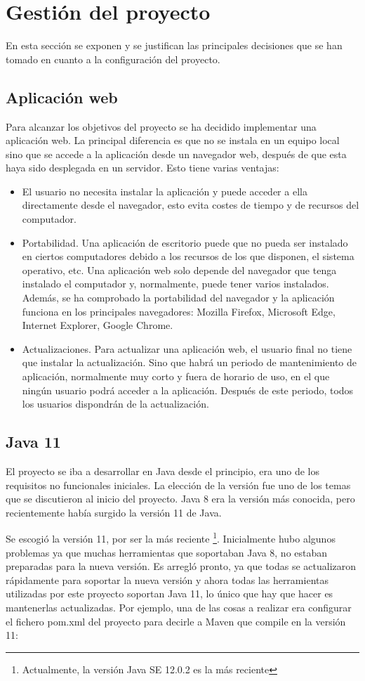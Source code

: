\section{Gestión del proyecto}
En esta sección se exponen y se justifican las principales decisiones que se han tomado en cuanto a la configuración del proyecto.
\subsection{Aplicación web}
Para alcanzar los objetivos del proyecto se ha decidido implementar una aplicación web. La principal diferencia es que no se instala en un equipo local sino que se accede a la aplicación desde un navegador web, después de que esta haya sido desplegada en un servidor. Esto tiene varias ventajas: 
\begin{itemize}
	\item El usuario no necesita instalar la aplicación y puede acceder a ella directamente desde el navegador, esto evita costes de tiempo y de recursos del computador.
	\item  Portabilidad. Una aplicación de escritorio puede que no pueda ser instalado en ciertos computadores debido a los recursos de los que disponen, el sistema operativo, etc. Una aplicación web solo depende del navegador que tenga instalado el computador y, normalmente, puede tener varios instalados. Además, se ha comprobado la portabilidad del navegador y la aplicación funciona en los principales navegadores: Mozilla Firefox, Microsoft Edge, Internet Explorer, Google Chrome.
	\item Actualizaciones. Para actualizar una aplicación web, el usuario final no tiene que instalar la actualización. Sino que habrá un periodo de mantenimiento de aplicación, normalmente muy corto y fuera de horario de uso, en el que ningún usuario podrá acceder a la aplicación. Después de este periodo, todos los usuarios dispondrán de la actualización.
\end{itemize}
\subsection{Java 11}
El proyecto se iba a desarrollar en Java desde el principio, era uno de los requisitos no funcionales iniciales. La elección de la versión fue uno de los temas que se discutieron al inicio del proyecto. Java 8 era la versión más conocida, pero recientemente había surgido la versión 11 de Java. 

Se escogió la versión 11, por ser la más reciente \footnote{Actualmente, la versión Java SE 12.0.2 es la más reciente}. Inicialmente hubo algunos problemas ya que muchas herramientas que soportaban Java 8, no estaban preparadas para la nueva versión. Es arregló pronto, ya que todas se actualizaron rápidamente para soportar la nueva versión y ahora todas las herramientas utilizadas por este proyecto soportan Java 11, lo único que hay que hacer es mantenerlas actualizadas. Por ejemplo, una de las cosas a realizar era configurar el fichero pom.xml del proyecto para decirle a Maven que compile en la versión 11:

